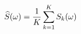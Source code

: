 \documentclass[preview]{standalone}
\begin{document}
\begin{align*}
\special{dvisvgm:raw <g id='unique000'>}\widehat{S}(\omega)=\frac{1}{K}\sum_{k=1}^{K}S_k(\omega)\special{dvisvgm:raw </g>}
\end{align*}
\end{document}
